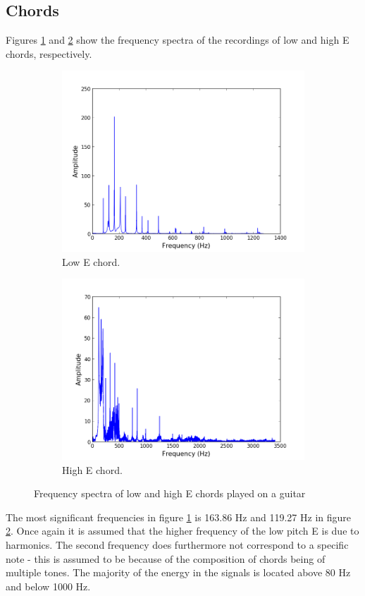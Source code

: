 \subsection{Chords}
Figures \ref{fig:chord_low} and \ref{fig:chord_high} show the frequency spectra of the recordings of low and high E chords, respectively.
\begin{figure}[H]
\centering
\begin{subfigure}{0.49\textwidth}
\centering
\includegraphics[width=\textwidth]{figures/freqanal/chord_low.png}
\caption{Low E chord.}
\label{fig:chord_low}
\end{subfigure}
\begin{subfigure}{0.49\textwidth}
\centering
\includegraphics[width = \textwidth]{figures/freqanal/chord_high.png}
\caption{High E chord.}
\label{fig:chord_high}
\end{subfigure}
\caption{Frequency spectra of low and high E chords played on a guitar}
\label{fig:chord}
\end{figure}
The most significant frequencies in figure \ref{fig:chord_low} is 163.86 Hz and 119.27 Hz in figure \ref{fig:chord_high}. Once again it is assumed that the higher frequency of the low pitch E is due to harmonics. The second frequency does furthermore not correspond to a specific note - this is assumed to be because of the composition of chords being of multiple tones. The majority of the energy in the signals is located above 80 Hz and below 1000 Hz.
